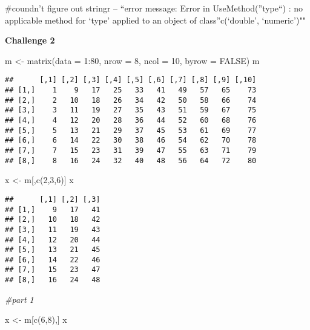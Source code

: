 \documentclass[
]{article}
\newenvironment{Shaded}{\begin{snugshade}}{\end{snugshade}}
\newcommand{\AttributeTok}[1]{\textcolor[rgb]{0.77,0.63,0.00}{#1}}
\newcommand{\CommentTok}[1]{\textcolor[rgb]{0.56,0.35,0.01}{\textit{#1}}}
\newcommand{\ConstantTok}[1]{\textcolor[rgb]{0.00,0.00,0.00}{#1}}
\newcommand{\DecValTok}[1]{\textcolor[rgb]{0.00,0.00,0.81}{#1}}
\newcommand{\FunctionTok}[1]{\textcolor[rgb]{0.00,0.00,0.00}{#1}}
\newcommand{\NormalTok}[1]{#1}
\newcommand{\OtherTok}[1]{\textcolor[rgb]{0.56,0.35,0.01}{#1}}
\newcommand{\SpecialCharTok}[1]{\textcolor[rgb]{0.00,0.00,0.00}{#1}}
\begin{document}
\#coundn't figure out stringr -- ``error message: Error in
UseMethod(''type``) : no applicable method for `type' applied to an
object of class''c(`double', `numeric')""

\textbf{Challenge 2}

\begin{Shaded}
\begin{Highlighting}[]
\NormalTok{m }\OtherTok{\textless{}{-}} \FunctionTok{matrix}\NormalTok{(}\AttributeTok{data =} \DecValTok{1}\SpecialCharTok{:}\DecValTok{80}\NormalTok{, }\AttributeTok{nrow =} \DecValTok{8}\NormalTok{, }\AttributeTok{ncol =} \DecValTok{10}\NormalTok{, }\AttributeTok{byrow =} \ConstantTok{FALSE}\NormalTok{)}
\NormalTok{m}
\end{Highlighting}
\end{Shaded}

\begin{verbatim}
##      [,1] [,2] [,3] [,4] [,5] [,6] [,7] [,8] [,9] [,10]
## [1,]    1    9   17   25   33   41   49   57   65    73
## [2,]    2   10   18   26   34   42   50   58   66    74
## [3,]    3   11   19   27   35   43   51   59   67    75
## [4,]    4   12   20   28   36   44   52   60   68    76
## [5,]    5   13   21   29   37   45   53   61   69    77
## [6,]    6   14   22   30   38   46   54   62   70    78
## [7,]    7   15   23   31   39   47   55   63   71    79
## [8,]    8   16   24   32   40   48   56   64   72    80
\end{verbatim}

\begin{Shaded}
\begin{Highlighting}[]
\NormalTok{x }\OtherTok{\textless{}{-}}\NormalTok{ m[,}\FunctionTok{c}\NormalTok{(}\DecValTok{2}\NormalTok{,}\DecValTok{3}\NormalTok{,}\DecValTok{6}\NormalTok{)] }
\NormalTok{x}
\end{Highlighting}
\end{Shaded}

\begin{verbatim}
##      [,1] [,2] [,3]
## [1,]    9   17   41
## [2,]   10   18   42
## [3,]   11   19   43
## [4,]   12   20   44
## [5,]   13   21   45
## [6,]   14   22   46
## [7,]   15   23   47
## [8,]   16   24   48
\end{verbatim}

\begin{Shaded}
\begin{Highlighting}[]
\CommentTok{\#part 1}

\NormalTok{x }\OtherTok{\textless{}{-}}\NormalTok{ m[}\FunctionTok{c}\NormalTok{(}\DecValTok{6}\NormalTok{,}\DecValTok{8}\NormalTok{),] }
\NormalTok{x}
\end{Highlighting}
\end{Shaded}
\end{document}
